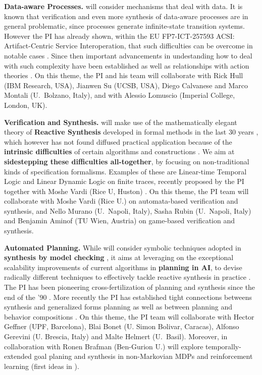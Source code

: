 \textbf{Data-aware Processes.}  \project will consider mechanisms that
deal with data. It is known that verification and even more
synthesis of data-aware processes are in general problematic, since
processes generate infinite-state transition systems. However the PI has
already shown, within the EU FP7-ICT-257593 ACSI: Artifact-Centric
Service Interoperation, that such difficulties can be overcome in
notable cases
\cite{BerardiCGHM05,CalvaneseGHS09,HaririCGDM13,CalvaneseGMP13}. Since
then important advancements in undestanding how to deal with such
complexity have been established as well as relationships with action theories
\cite{HaririCMGMF13,BelardinelliLP14,CalvaneseGS15,CDMP17}.  On this
theme, the PI and his team will collaborate with Rick Hull (IBM Research,
USA), Jianwen Su (UCSB, USA), Diego Calvanese and
Marco Montali (U.\ Bolzano, Italy), and with Alessio Lomuscio
(Imperial College, London, UK).

\textbf{Verification and Synthesis.}
\project  will make use of the mathematically elegant theory of \textbf{Reactive
  Synthesis} \cite{PnRo89} developed in formal methods in the last 30 years \cite{RecentSynthesis}, which
however has not found diffused practical application because of the
\textbf{intrinsic difficulties} of certain algorithms and constructions \cite{DFogartyKVW13}.
%
We aim at \textbf{sidestepping these difficulties all-together}, by
focusing on non-traditional kinds of specification
formalisms. Examples of these are Linear-time Temporal Logic and
Linear Dynamic Logic on finite traces, recently proposed by the PI together with Moshe Vardi (Rice U, Huston)
\cite{DeVa13,DeVa15,DeVa16}. %
On this theme, the PI team will collaborate with Moshe Vardi (Rice U.) on automata-based verification and synthesis, and Nello Murano (U.\ Napoli, Italy), Sasha Rubin (U.\ Napoli, Italy) and Benjamin Aminof (TU Wien, Austria) on game-based verification and synthesis.

\textbf{Automated Planning.}  While \project will consider symbolic techniques
adopted in \textbf{synthesis by model checking} \cite{BloemJPPS12}, it
aims at leveraging on the exceptional scalability improvements of
current algorithms in \textbf{planning in AI}, to devise radically
different techniques to effectively tackle reactive synthesis in
practice \cite{GeffnerBo13}.  The PI has been pioneering
cross-fertilization of planning and synthesis since the end of the '90
\cite{DeGiacomoV99,CalvaneseGV02,SardinaGLL06,DeGiacomoFPS10,PatriziLGG11,DeGMMP17}. More
recently the PI has established tight connections betweens synthesis
and generalized forms planning \cite{HuG11,HuG13,DeGiacomoMRS16,BDGR17} as well
 as between planning and behavior compositions
\cite{SardinaG08,DePS13,DeGGPSS16,CalvaneseGLV16}.  On this theme, the
PI team will collaborate with Hector Geffner (UPF, Barcelona), Blai
Bonet (U. Simon Bolivar, Caracas), Alfonso Gerevini (U. Brescia,
Italy) and Malte Helmert (U.\ Basil).  Moreover, in collaboration with
Ronen Brafman (Ben-Gurion U.) \project will explore
temporally-extended goal planing and synthesis in non-Markovian MDPs
and reinforcement learning (first ideas in \cite{BDMS17}).

